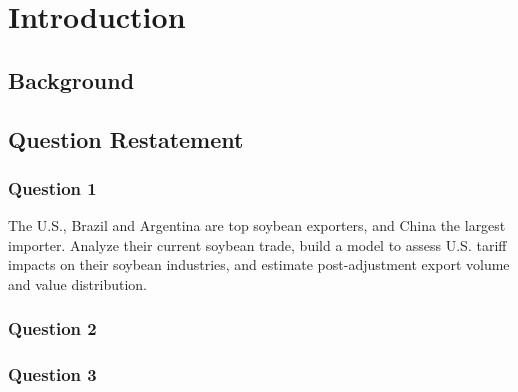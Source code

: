 \documentclass{apmcmthesis}
\begin{document}
\pagestyle{frontmatterstyle}

\begin{abstract}

\end{abstract}
\newpage


{
  \setlength{\parskip}{0pt}
  \tableofcontents
}






\newpage
\pagestyle{mainmatterstyle}
\setcounter{page}{1}

\section{Introduction}
\subsection{Background}


\subsection{Question Restatement}


\subsubsection{Question 1}
The U.S., Brazil and Argentina are top soybean exporters, and China the largest importer. Analyze their current soybean trade, build a model to assess U.S. tariff impacts on their soybean industries, and estimate post-adjustment export volume and value distribution.

\subsubsection{Question 2}


\subsubsection{Question 3}
\end{document}
